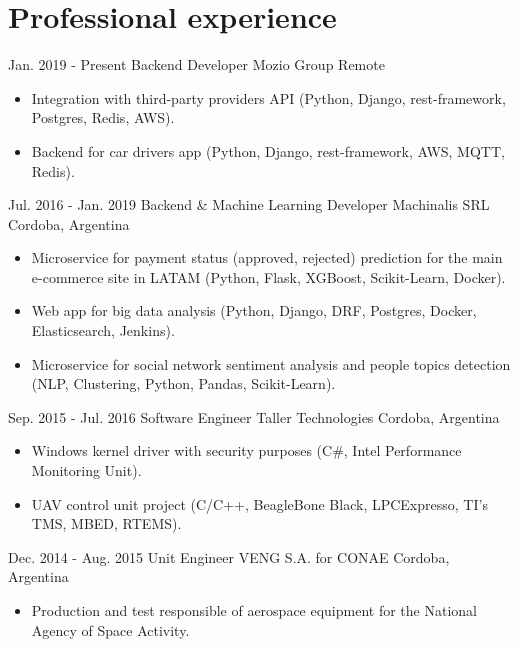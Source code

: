 
\section{Professional experience}

  \cventry
    {Jan. 2019 - Present} %
    {Backend Developer} %
    {Mozio Group} %
    {Remote} %
    {}
    {
      \begin{itemize} %
        \item {Integration with third-party providers API (Python, Django, rest-framework, Postgres, Redis, AWS).}
        \item {Backend for car drivers app (Python, Django, rest-framework, AWS, MQTT, Redis).}
      \end{itemize}
    }

  \cventry
    {Jul. 2016 - Jan. 2019} %
    {Backend \& Machine Learning Developer} %
    {Machinalis SRL} %
    {Cordoba, Argentina} %
    {}
    {
      \begin{itemize} %
        \item {Microservice for payment status (approved, rejected) prediction for the main e-commerce site in LATAM (Python, Flask, XGBoost, Scikit-Learn, Docker).}
        \item {Web app for big data analysis (Python, Django, DRF, Postgres, Docker, Elasticsearch, Jenkins).}
        \item {Microservice for social network sentiment analysis and people topics detection (NLP, Clustering, Python, Pandas, Scikit-Learn).}
      \end{itemize}
    }

  \cventry
    {Sep. 2015 - Jul. 2016} %
    {Software Engineer} %
    {Taller Technologies} %
    {Cordoba, Argentina} %
    {}
    {
      \begin{itemize} %
        \item {Windows kernel driver with security purposes (C\#, Intel Performance Monitoring Unit).}
        \item {UAV control unit project (C/C++, BeagleBone Black, LPCExpresso, TI's TMS, MBED, RTEMS).}
      \end{itemize}
    }

  \cventry
    {Dec. 2014 - Aug. 2015} %
    {Unit Engineer} %
    {VENG S.A. for CONAE} %
    {Cordoba, Argentina} %
    {}
    {
      \begin{itemize} %
        \item {Production and test responsible of aerospace equipment for the National Agency of Space Activity.}
      \end{itemize}
    }

